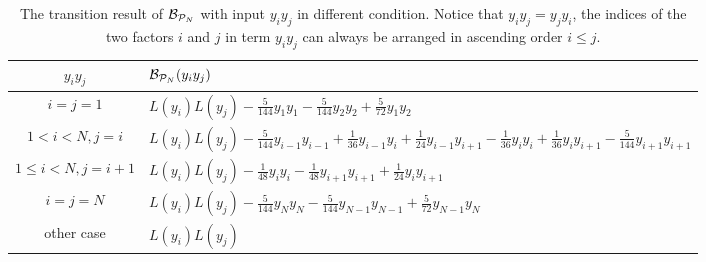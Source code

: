 \documentclass[showpacs,onecolumn,aps,prx,long bibliography,superscriptaddress,notitlepage]{revtex4-1}
\begin{document}
\begin{table}
    \centering
    \renewcommand\arraystretch{2}
    \begin{tabular}{|c|l|}
        \hline$y_i y_j$ & $ \mathcal{B}_{\mathcal{P}_N} (y_i y_j) $ \\
        \hline$i=j=1$ & $L(y_i)L(y_j) -\frac{5}{144} y_1 y_1-\frac{5}{144} y_2 y_2+\frac{5}{72} y_1 y_2$ \\
        \hline $1<i<N, j=i$ & $L(y_i)L(y_j)-\frac{5}{144} y_{i-1} y_{i-1}+\frac{1}{36} y_{i-1} y_i+\frac{1}                           {24} y_{i-1} y_{i+1}-\frac{1}{36} y_i y_i+\frac{1}{36} y_i y_{i+1}-\frac{5}{144} y_{i+1} y_{i+1}$ \\
        \hline $1 \leq i<N, j=i+1$ & $L(y_i)L(y_j)-\frac{1}{48} y_i y_i-\frac{1}{48} y_{i+1} y_{i+1}+\frac{1}{24} y_i y_{i+1}$ \\
        \hline$i=j=N$ & $L(y_i)L(y_j)-\frac{5}{144} y_N y_N-\frac{5}{144} y_{N-1} y_{N-1}+\frac{5}{72} y_{N-1} y_N$ \\
        \hline other case & $L(y_i)L(y_j)$ \\
        \hline
    \end{tabular}
    \caption{The transition result of $\mathcal{B}_{\mathcal{P}_N}$ with input $y_iy_j$ in different condition. Notice that $y_i y_j = y_j y_i$, the indices of the two factors $i$ and $j$ in term $y_iy_j$ can always be arranged in ascending order $i\leq j$.}
    \label{table: transition table of teto}
\end{table}
\end{document}
